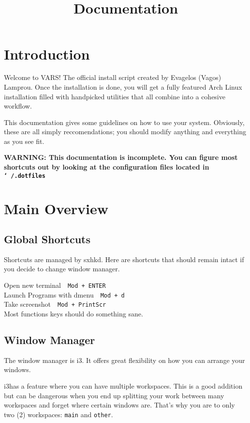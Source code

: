 \documentclass{article}
\author{\me}
\title{\sys Documentation}
\date{}
\newcommand{\ttt}[1]{\texttt{#1}}
\newcommand{\shortcut}[2]{#1~\dotfill{}~\ttt{#2}\\} %
\newcommand{\me}{Evagelos (Vagos) Lamprou}
\newcommand{\wm}{i3}
\newcommand{\shrtcm}{sxhkd}
\begin{document}
\maketitle
\tableofcontents

\section{Introduction}

Welcome to VARS! The official install script created by \me. Once the installation 
is done, you will get a fully featured Arch Linux installation filled with handpicked 
utilities that all combine into a cohesive workflow.

This documentation gives some guidelines on how to use your system. Obviously, 
these are all simply reccomendations; you should modify anything and everything
as you see fit.

\textbf{WARNING: This documentation is incomplete. You can figure most shortcuts out 
by looking at the configuration files located in 
\ttt{\char`~/.dotfiles}}

\section{Main Overview}

\subsection{Global Shortcuts}

Shortcuts are managed by \shrtcm. Here are shortcuts that 
should remain intact if you decide to change window manager.

\begin{minipage}{\textwidth}

\shortcut{Open new terminal}{Mod + ENTER}
\shortcut{Launch Programs with dmenu}{Mod + d}
\shortcut{Take screenshot}{Mod + PrintScr}

Most functions keys should do something sane.

\end{minipage}


\subsection{Window Manager}

The window manager is \wm. It offers great flexibility on how you 
can arrange your windows. 

\wm has a feature where you can have multiple workspaces. 
This is a good addition but can be dangerous when you end 
up splitting your work between many workspaces and forget 
where certain windows are. 
That's why you are  to only two (2) workspaces: \ttt{main} and \ttt{other}.
\end{document}
